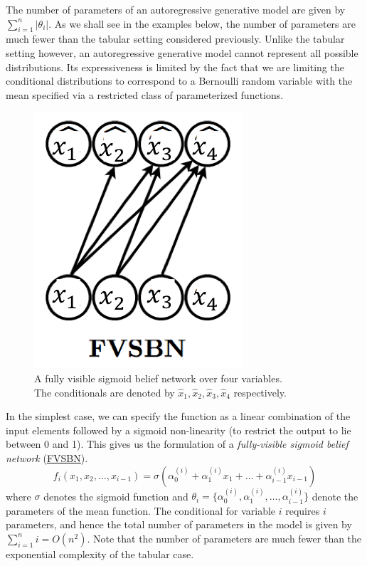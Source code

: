 The number of parameters of an autoregressive generative model are given by 
$\sum_{i=1}^n \vert \theta_i \vert$. As we shall see in the examples below, the number 
of parameters are much fewer than the tabular setting considered previously. Unlike the 
tabular setting however, an autoregressive generative model cannot represent all 
possible distributions. Its expressiveness is limited by the fact that we are limiting 
the conditional distributions to correspond to a Bernoulli random variable with the 
mean specified via a restricted class of parameterized functions.

\begin{figure}[H]
\centering
\includegraphics[scale=0.618]{pix/dgm/fvsbn.png}
\caption{A fully visible sigmoid belief network over four variables. \\ The conditionals 
are denoted by \(\widehat{x}_1, \widehat{x}_2, \widehat{x}_3, \widehat{x}_4\) 
respectively.}
\end{figure}
In the simplest case, we can specify the function as a linear combination of the input 
elements followed by a sigmoid non-linearity (to restrict the output to lie between 0 
and 1). This gives us the formulation of a \textit{fully-visible sigmoid belief network} 
(\href{https://papers.nips.cc/paper/1153-does-the-wake-sleep-algorithm-produce-good-density-estimators.pdf}{FVSBN}).
$$
f_i(x_1, x_2, \ldots, x_{i-1}) =\sigma\left(\alpha^{(i)}_0 + \alpha^{(i)}_1 x_1 + \ldots + 
\alpha^{(i)}_{i-1} x_{i-1}\right)  
$$
where $\sigma$ denotes the sigmoid function and $\theta_i=\{\alpha^{(i)}_0,\alpha^{(i)}_1, 
\ldots, \alpha^{(i)}_{i-1}\}$ denote the parameters of the mean function. The conditional 
for variable $i$ requires $i$ parameters, and hence the total number of parameters in 
the model is given by $\sum_{i=1}^ni= O(n^2)$. Note that the number of parameters are 
much fewer than the exponential complexity of the tabular case.

